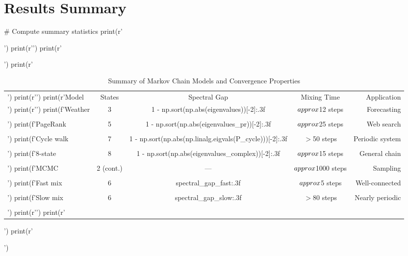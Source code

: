 \documentclass[11pt,a4paper]{article}
\begin{document}
\section{Results Summary}

\begin{pycode}
# Compute summary statistics
print(r'\begin{table}[H]')
print(r'\centering')
print(r'\caption{Summary of Markov Chain Models and Convergence Properties}')
print(r'\begin{tabular}{@{}lcccr@{}}')
print(r'\toprule')
print(r'Model & States & Spectral Gap & Mixing Time & Application \\')
print(r'\midrule')
print(f'Weather & 3 & {1 - np.sort(np.abs(eigenvalues))[-2]:.3f} & $\\approx$12 steps & Forecasting \\\\')
print(f'PageRank & 5 & {1 - np.sort(np.abs(eigenvalues_pr))[-2]:.3f} & $\\approx$25 steps & Web search \\\\')
print(f'Cycle walk & 7 & {1 - np.sort(np.abs(np.linalg.eigvals(P_cycle)))[-2]:.3f} & $>$50 steps & Periodic system \\\\')
print(f'8-state & 8 & {1 - np.sort(np.abs(eigenvalues_complex))[-2]:.3f} & $\\approx$15 steps & General chain \\\\')
print(f'MCMC & 2 (cont.) & --- & $\\approx$1000 steps & Sampling \\\\')
print(f'Fast mix & 6 & {spectral_gap_fast:.3f} & $\\approx$5 steps & Well-connected \\\\')
print(f'Slow mix & 6 & {spectral_gap_slow:.3f} & $>$80 steps & Nearly periodic \\\\')
print(r'\bottomrule')
print(r'\end{tabular}')
print(r'\end{table}')


\end{pycode}
\end{document}
